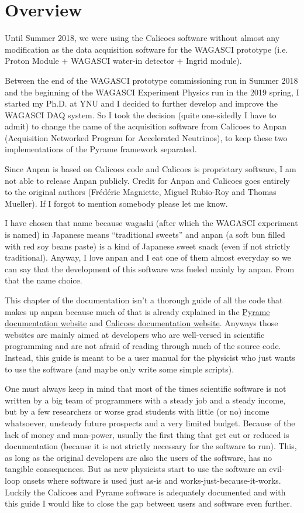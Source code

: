 \section{Overview}
Until Summer 2018, we were using the Calicoes software without almost any
modification as the data acquisition software for the WAGASCI prototype
(i.e. Proton Module + WAGASCI water-in detector + Ingrid module).

Between the end of the WAGASCI prototype commissioning run in Summer 2018 and
the beginning of the WAGASCI Experiment Physics run in the 2019 spring, I
started my Ph.D. at YNU and I decided to further develop and improve the WAGASCI
DAQ system. So I took the decision (quite one-sidedly I have to admit) to change
the name of the acquisition software from Calicoes to Anpan (Acquisition
Networked Program for Accelerated Neutrinos), to keep these two implementations
of the Pyrame framework separated.

Since Anpan is based on Calicoes code and Calicoes is proprietary software, I am
not able to release Anpan publicly. Credit for Anpan and Calicoes goes entirely
to the original authors (Frédéric Magniette, Miguel Rubio-Roy and Thomas
Mueller). If I forgot to mention somebody please let me know.

I have chosen that name because wagashi (after which the WAGASCI experiment is
named) in Japanese means ``traditional sweets'' and anpan (a soft bun filled
with red soy beans paste) is a kind of Japanese sweet snack (even if not
strictly traditional). Anyway, I love anpan and I eat one of them almost
everyday so we can say that the development of this software was fueled mainly
by anpan. From that the name choice.

This chapter of the documentation isn't a thorough guide of all the code that
makes up anpan because much of that is already explained in the
\href{http://llr.in2p3.fr/sites/pyrame/documentation/}{Pyrame documentation
  website} and
\href{http://llr.in2p3.fr/sites/pyrame/calicoes/documentation/}{Calicoes
  documentation website}. Anyways those websites are mainly aimed at developers
who are well-versed in scientific programming and are not afraid of reading
through much of the source code. Instead, this guide is meant to be a user
manual for the physicist who just wants to use the software (and maybe only
write some simple scripts).

One must always keep in mind that most of the times scientific software is not
written by a big team of programmers with a steady job and a steady income, but
by a few researchers or worse grad students with little (or no) income
whatsoever, unsteady future prospects and a very limited budget. Because of the
lack of money and man-power, usually the first thing that get cut or reduced is
documentation (because it is not strictly necessary for the software to
run). This, as long as the original developers are also the users of the
software, has no tangible consequences. But as new physicists start to use the
software an evil-loop onsets where software is used just as-is and
works-just-because-it-works. Luckily the Calicoes and Pyrame software is
adequately documented and with this guide I would like to close the gap between
users and software even further.

